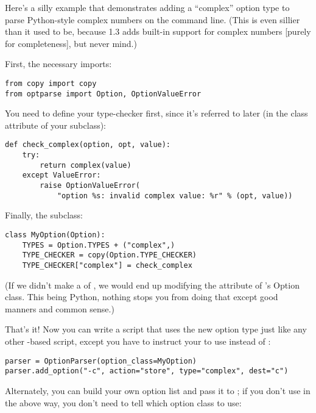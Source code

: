 Here's a silly example that demonstrates adding a ``complex'' option
type to parse Python-style complex numbers on the command line.  (This
is even sillier than it used to be, because  1.3 adds
built-in support for complex numbers [purely for completeness], but
never mind.)

First, the necessary imports:

\begin{verbatim}
from copy import copy
from optparse import Option, OptionValueError
\end{verbatim}

You need to define your type-checker first, since it's referred to
later (in the  class attribute of your
 subclass):

\begin{verbatim}
def check_complex(option, opt, value):
    try:
        return complex(value)
    except ValueError:
        raise OptionValueError(
            "option %s: invalid complex value: %r" % (opt, value))
\end{verbatim}

Finally, the  subclass:

\begin{verbatim}
class MyOption(Option):
    TYPES = Option.TYPES + ("complex",)
    TYPE_CHECKER = copy(Option.TYPE_CHECKER)
    TYPE_CHECKER["complex"] = check_complex
\end{verbatim}

(If we didn't make a  of
, we would end up modifying the
 attribute of 's Option class.
This being Python, nothing stops you from doing that except good
manners and common sense.)

That's it!  Now you can write a script that uses the new option type
just like any other -based script, except you have to
instruct your  to use  instead of
:

\begin{verbatim}
parser = OptionParser(option_class=MyOption)
parser.add_option("-c", action="store", type="complex", dest="c")
\end{verbatim}

Alternately, you can build your own option list and pass it to
; if you don't use  in the
above way, you don't need to tell  which option
class to use:

